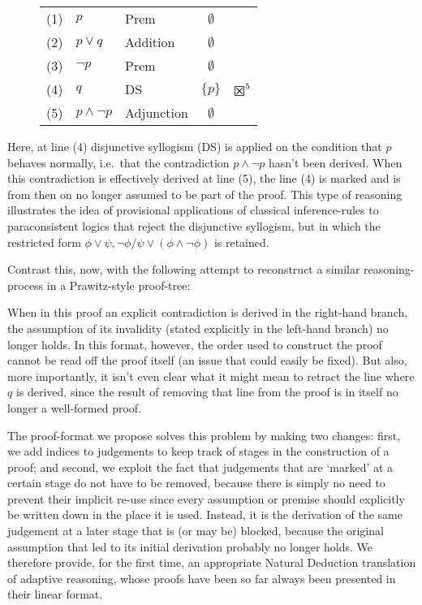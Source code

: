 \documentclass[]{article}
\begin{document}
\begin{figure}[h!]
\centering
    \begin{tabular}{cllcl}
        (1) & $p$ & Prem & $\emptyset$\\
        (2) & $p \vee q$ & Addition & $\emptyset$\\
        (3) & $\neg p$ & Prem & $\emptyset$\\
        (4) & $q$ & DS & $\{p\}$ & $\XBox^5$\\
        (5) & $p \wedge \neg p$ & Adjunction & $\emptyset$
    \end{tabular}
\end{figure}
\noindent Here, at line (4) disjunctive syllogism (DS) is applied on the condition that $p$ behaves normally, i.e.\ that the contradiction $p \wedge \neg p$ hasn't been derived. When this contradiction is effectively derived at line (5), the line (4) is marked and is from then on no longer assumed to be part of the proof. This type of reasoning illustrates the idea of provisional applications of classical inference-rules to paraconsistent logics that reject the disjunctive syllogism, but in which the restricted form $\phi \vee \psi, \neg \phi / \psi \vee (\phi \wedge \neg \phi)$ is retained.

Contrast this, now, with the following attempt to reconstruct a similar reasoning-process in a Prawitz-style proof-tree:
\begin{prooftree}
\end{prooftree}
When in this proof an explicit contradiction is derived in the right-hand branch, the assumption of its invalidity (stated explicitly in the left-hand branch) no longer holds. In this format, however, the order used to construct the proof cannot be read off the proof itself (an issue that could easily be fixed). But also, more importantly, it isn't even clear what it might mean to retract the line where $q$ is derived, since the result of removing that line from the proof is in itself no longer a well-formed proof.

The proof-format we propose solves this problem by making two changes: first, we add indices to judgements to keep track of stages in the construction of a proof; and second, we exploit the fact that judgements that are `marked' at a certain stage do not have to be removed, because there is simply no need to prevent their implicit re-use since every assumption or premise should explicitly be written down in the place it is used. Instead, it is the derivation of the same judgement at a later stage that is (or may be) blocked, because the original assumption that led to its initial derivation probably no longer holds. We therefore provide, for the first time, an appropriate Natural Deduction translation of adaptive reasoning, whose proofs have been so far always been presented in their linear format. 
\end{document}
